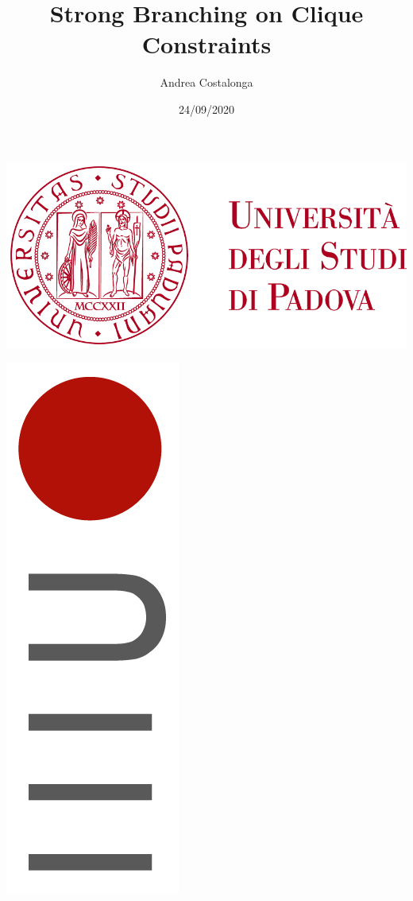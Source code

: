 \documentclass[12pt,a4paper,twoside,openright]{book}
\title{Strong Branching on Clique Constraints}
\author{Andrea Costalonga}
\date{24/09/2020}
\begin{document}
\begin{titlepage}
 
\begin{minipage}{0.4\textwidth}
    \begin{flushleft}
        \includegraphics[scale=.7]{logo_unipd.png}
    \end{flushleft}
\end{minipage}
\begin{minipage}{0.4\textwidth}
    \begin{flushright}
        \includegraphics[scale=.5]{logo_dei.png}
    \end{flushright}
\end{minipage}
\\[1.5cm] 


\end{titlepage}
\end{document}
